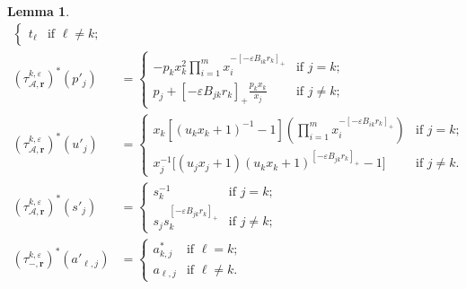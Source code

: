 \documentclass{amsart}
\newtheorem{lemma}[theorem]{Lemma}
\numberwithin{equation}{section}
\newcommand{\bfr}{{\boldsymbol{r}}}
\newcommand{\cA}{\mathcal{A}}
\begin{document}
\begin{lemma}
\begin{align}
\begin{cases}
      t_\ell & \text{if $\ell\ne k$;}
    \end{cases}\\
    \label{eq:tropical GA transformation}
    (\tau_{\cA,\bfr}^{k,\varepsilon})^*(p'_j)&=
    \begin{cases} 
      -p_k x_k^2 \prod\limits_{i=1}^m x_i^{-[-\varepsilon B_{ik} r_k]_+} & \text{if $j=k$;}\\ 
      p_j + [-\varepsilon B_{jk} r_k]_+ \frac{p_k x_k}{x_j} & \text{if $j\ne k$;}
    \end{cases}\\
    \nonumber
    (\tau_{\cA,\bfr}^{k,\varepsilon})^*(u'_j)
    &=\begin{cases} 
      x_k \left[ (u_k x_k +1)^{-1} -1\right] \left(\prod_{i=1}^m x_i^{-[-\varepsilon B_{ik} r_k]_+}\right) & \text{if $j=k$;}\\ 
      x_j^{-1}\big[(u_j x_j + 1) (u_k x_k + 1)^{[-\varepsilon B_{jk} r_k]_+}-1\big] & \text{if $j\ne k$.}
    \end{cases}\\
    \nonumber
    (\tau_{\cA,\bfr}^{k,\varepsilon})^*(s'_j)
    &=\begin{cases} 
      s_k^{-1} & \text{if $j=k$;}\\ 
      s_j s_k^{[-\varepsilon B_{jk} r_k]_+} & \text{if $j\ne k$;}
    \end{cases}\\
    \nonumber
    (\tau_{-,\bfr}^{k,\varepsilon})^*(a'_{\ell,j})
    &=
    \begin{cases}
      a^*_{k,j} & \text{if $\ell=k$;}\\
      a_{\ell,j} & \text{if $\ell\ne k$.}
    \end{cases}
  \end{align}
\end{lemma}
\end{document}
